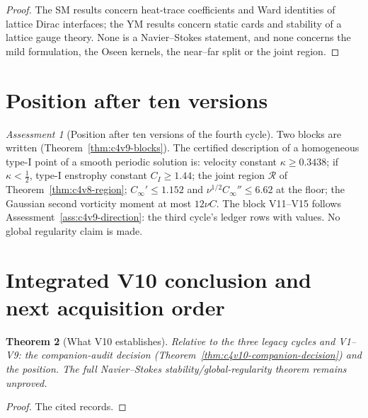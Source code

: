 \documentclass[11pt]{article}
\theoremstyle{plain}
\newtheorem{theorem}{Theorem}[section]
\theoremstyle{definition}
\theoremstyle{remark}
\newtheorem{assessment}[theorem]{Assessment}
\begin{document}
\begin{proof}
The SM results concern heat-trace coefficients and Ward identities
of lattice Dirac interfaces; the YM results concern static cards
and stability of a lattice gauge theory.  None is a Navier--Stokes
statement, and none concerns the mild formulation, the Oseen
kernels, the near--far split or the joint region.
\end{proof}

\section{Position after ten versions}
\label{sec:c4v10-position}

\begin{assessment}[Position after ten versions of the fourth cycle]
\label{ass:c4v10-position-ten}
Two blocks are written (Theorem~\ref{thm:c4v9-blocks}).  The certified
description of a homogeneous type-I point of a smooth periodic
solution is: velocity constant \(\kappa\ge0.3438\); if \(\kappa<\frac12\), type-I enstrophy
constant \(C_I\ge1.44\); the joint region \(\mathcal R\) of Theorem~\ref{thm:c4v8-region};
\(C_\infty'\le1.152\) and \(\nu^{1/2}C_\infty''\le6.62\) at the floor; the Gaussian second
vorticity moment at most \(12\nu C\).  The block V11--V15 follows
Assessment~\ref{ass:c4v9-direction}: the third cycle's ledger rows with
values.  No global regularity claim is made.
\end{assessment}

\section{Integrated V10 conclusion and next acquisition order}
\label{sec:c4v10-conclusion}

\begin{theorem}[What V10 establishes]
\label{thm:c4v10-conclusion}
Relative to the three legacy cycles and V1--V9: the companion-audit
decision (Theorem~\ref{thm:c4v10-companion-decision}) and the position.
The full Navier--Stokes stability/global-regularity theorem remains
unproved.
\end{theorem}

\begin{proof}
The cited records.
\end{proof}
\end{document}
